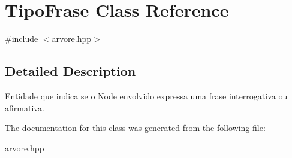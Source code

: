 \hypertarget{classTipoFrase}{}\section{Tipo\+Frase Class Reference}
\label{classTipoFrase}


{\ttfamily \#include $<$arvore.\+hpp$>$}



\subsection{Detailed Description}
Entidade que indica se o Node envolvido expressa uma frase interrogativa ou afirmativa. 

The documentation for this class was generated from the following file\+:\begin{DoxyCompactItemize}
\item 
arvore.\+hpp\end{DoxyCompactItemize}
